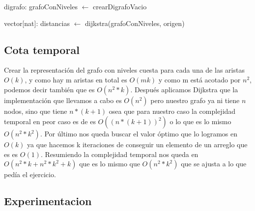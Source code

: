 \par
\begin{algorithm}[H]
		\NoCaptionOfAlgo
		\caption{}	
		digrafo: grafoConNiveles $\leftarrow$ crearDigrafoVacio\\
		
	
		vector[nat]: distancias $\leftarrow$ dijkstra(grafoConNiveles, origen)\\

	\end{algorithm}


\subsection{Cota temporal}
Crear la representación del grafo con niveles cuesta para cada una de las aristas $O(k)$, y como hay m aristas en total es $O(mk)$ y como m está acotado por $n^2$, podemos decir también que es $O(n^2*k)$. Después aplicamos Dijkstra que la implementación que llevamos a cabo es $O(n^2)$ pero nuestro grafo ya ni tiene $n$ nodos, sino que tiene $n*(k+1)$ osea que para nuestro caso la complejidad temporal en peor caso es de es $O((n*(k+1))^2)$ o lo que es lo mismo $O(n^2*k^2)$. Por último nos queda buscar el valor óptimo que lo logramos en $O(k)$ ya que hacemos k iteraciones de conseguir un elemento de un arreglo que es es $O(1)$. Resumiendo la complejidad temporal nos queda en $O( n^2*k + n^2*k^2 + k )$ que es lo mismo que $O(n^2*k^2)$ que se ajusta a lo que pedía el ejercicio.

\subsection{Experimentacion}

\pagebreak